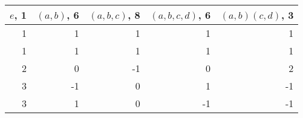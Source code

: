 \begin{tabular}{rrrrr}
\toprule
 $e$, 1 &  $(a, b)$, 6 &  $(a, b, c)$, 8 &  $(a, b, c, d)$, 6 &  $(a, b)(c,d)$, 3 \\
\midrule
      1 &            1 &               1 &                  1 &                 1 \\
      1 &            1 &               1 &                  1 &                 1 \\
      2 &            0 &              -1 &                  0 &                 2 \\
      3 &           -1 &               0 &                  1 &                -1 \\
      3 &            1 &               0 &                 -1 &                -1 \\
\bottomrule
\end{tabular}
